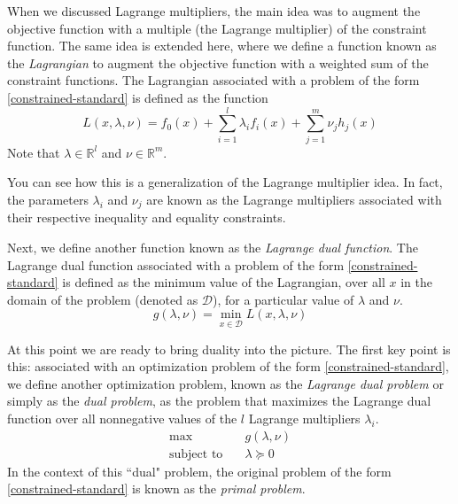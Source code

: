 \documentclass[a4paper]{article}
\theoremstyle{definition}
\begin{document}
When we discussed Lagrange multipliers, the main idea was to augment the objective function with a multiple (the Lagrange multiplier) of the constraint function.
The same idea is extended here, where we define a function known as the \textit{Lagrangian} to augment the objective function with a weighted sum of the constraint functions.
The Lagrangian associated with a problem of the form \eqref{constrained-standard} is defined as the function
\begin{equation}
	\label{lagrangian}
	L(x, \lambda, \nu) = f_0(x) + \sum_{i=1}^{l} \lambda_i f_i(x) + \sum_{j=1}^m \nu_j h_j(x)
\end{equation}
Note that $\lambda \in \mathbb{R}^l$ and $\nu \in \mathbb{R}^m$.

You can see how this is a generalization of the Lagrange multiplier idea.
In fact, the parameters $\lambda_i$ and $\nu_j$ are known as the Lagrange multipliers associated with their respective inequality and equality constraints.

Next, we define another function known as the \textit{Lagrange dual function}.
The Lagrange dual function associated with a problem of the form \eqref{constrained-standard} is defined as the minimum value of the Lagrangian, over all $x$ in the domain of the problem (denoted as $\mathcal{D}$), for a particular value of $\lambda$ and $\nu$.
\begin{equation}
	\label{lagrange-dual-function}
	g(\lambda, \nu) = \min_{x \in \mathcal{D}} L(x, \lambda, \nu)
\end{equation}

At this point we are ready to bring duality into the picture.
The first key point is this: associated with an optimization problem of the form \eqref{constrained-standard}, we define another optimization problem, known as the \textit{Lagrange dual problem} or simply as the \textit{dual problem}, as the problem that maximizes the Lagrange dual function over all nonnegative values of the $l$ Lagrange multipliers $\lambda_i$.
\begin{equation}
	\label{dual-problem}
	\begin{aligned}
		\max \quad & g(\lambda, \nu) \\
		\text{subject to} \quad & \lambda \succeq 0
	\end{aligned}
\end{equation}
In the context of this ``dual" problem, the original problem of the form \eqref{constrained-standard} is known as the \textit{primal problem}.
\end{document}
